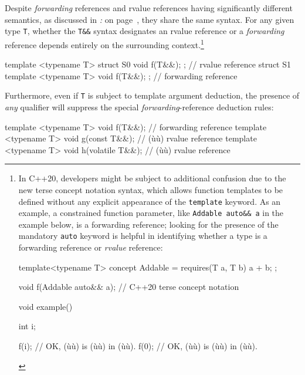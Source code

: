 Despite \emph{forwarding} references and rvalue
references having significantly different semantics, as discussed in \textit{: } on page~\pageref{identifying-forwarding-references}, they share the same syntax. For any given type \texttt{T},
whether the \texttt{T\&\&} syntax designates an rvalue
reference or a \emph{forwarding} reference depends entirely on the
surrounding context.{\cprotect\footnote{In C++20, developers might be
subject to additional confusion due to the new terse concept notation
syntax, which allows function templates to be defined without any
explicit appearance of the \texttt{template} keyword. As an example, a
constrained function parameter, like
\texttt{Addable}~\texttt{auto\&\&}~\texttt{a} in the example below, is a forwarding
reference; looking for the presence of the mandatory \texttt{auto}
keyword is helpful in identifying whether a type is a forwarding
reference or \emph{rvalue} reference:

\begin{emcppslisting}[emcppsstandards=c++20,basicstyle={\ttfamily\footnotesize}]
template<typename T>
concept Addable = requires(T a, T b) { a + b; };

void f(Addable auto&& a);  // C++20 terse concept notation

void example()
{
    int i;

    f(i);  // OK, (ù{}ù) is (ù{}ù) in (ù{}ù).
    f(0);  // OK, (ù{}ù) is (ù{}ù) in (ù{}ù).
}
\end{emcppslisting}
      }}

\begin{emcppslisting}
template <typename T> struct S0 { void f(T&&); };  // rvalue reference
struct S1 { template <typename T> void f(T&&); };  // forwarding reference
\end{emcppslisting}

\noindent Furthermore, even if \texttt{T} is subject to template argument
deduction, the presence of \emph{any} qualifier will suppress the
special \emph{forwarding}-reference deduction rules:

\begin{emcppslisting}
template <typename T> void f(T&&);           // forwarding reference
template <typename T> void g(const T&&);     // (ù{}ù) rvalue reference
template <typename T> void h(volatile T&&);  // (ù{}ù) rvalue reference
\end{emcppslisting}

